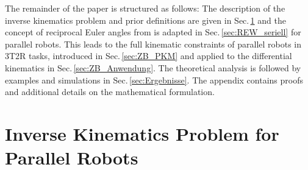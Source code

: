 \documentclass[robotics,article,submit,moreauthors,pdftex]{Definitions/mdpi}
\begin{document}

The remainder of the paper is structured as follows:
The description of the inverse kinematics problem and prior definitions are given in Sec.\,\ref{sec:PKM_general} and the concept of reciprocal Euler angles from \cite{1_SchapplerTapOrt2019} is adapted in Sec.\,\ref{sec:REW_seriell} for parallel robots.
This leads to the full kinematic constraints of parallel robots in 3T2R tasks, introduced in Sec.\,\ref{sec:ZB_PKM} and applied to the differential kinematics in Sec.\,\ref{sec:ZB_Anwendung}.
The theoretical analysis is followed by examples and simulations in Sec.\,\ref{sec:Ergebnisse}.
The appendix contains proofs and additional details on the mathematical formulation.

\section{Inverse Kinematics Problem for Parallel Robots}
\label{sec:PKM_general}
\end{document}
